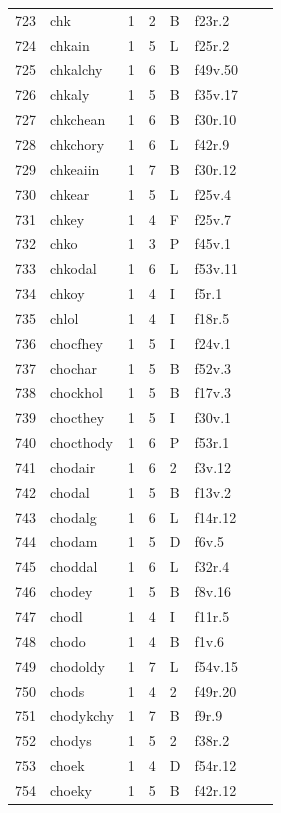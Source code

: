 \documentclass[11pt,a4paper]{article}
\begin{document}
\begin{landscape}
\begin{longtable}{@{}r>{\ttfamily}lrrl>{\ttfamily}l>{\raggedright\arraybackslash}p{80mm}>{\raggedright\arraybackslash}p{36mm}@{}}
723 & chk & 1 & 2 & B & f23r.2 &  & \\
724 & chkain & 1 & 5 & L & f25r.2 &  & \\
725 & chkalchy & 1 & 6 & B & f49v.50 &  & \\
726 & chkaly & 1 & 5 & B & f35v.17 &  & \\
727 & chkchean & 1 & 6 & B & f30r.10 &  & \\
728 & chkchory & 1 & 6 & L & f42r.9 &  & \\
729 & chkeaiin & 1 & 7 & B & f30r.12 &  & \\
730 & chkear & 1 & 5 & L & f25v.4 &  & \\
731 & chkey & 1 & 4 & F & f25v.7 &  & \\
732 & chko & 1 & 3 & P & f45v.1 &  & \\
733 & chkodal & 1 & 6 & L & f53v.11 &  & \\
734 & chkoy & 1 & 4 & I & f5r.1 &  & \\
735 & chlol & 1 & 4 & I & f18r.5 &  & \\
736 & chocfhey & 1 & 5 & I & f24v.1 &  & \\
737 & chochar & 1 & 5 & B & f52v.3 &  & \\
738 & chockhol & 1 & 5 & B & f17v.3 &  & \\
739 & chocthey & 1 & 5 & I & f30v.1 &  & \\
740 & chocthody & 1 & 6 & P & f53r.1 &  & \\
741 & chodair & 1 & 6 & 2 & f3v.12 &  & \\
742 & chodal & 1 & 5 & B & f13v.2 &  & \\
743 & chodalg & 1 & 6 & L & f14r.12 &  & \\
744 & chodam & 1 & 5 & D & f6v.5 &  & \\
745 & choddal & 1 & 6 & L & f32r.4 &  & \\
746 & chodey & 1 & 5 & B & f8v.16 &  & \\
747 & chodl & 1 & 4 & I & f11r.5 &  & \\
748 & chodo & 1 & 4 & B & f1v.6 &  & \\
749 & chodoldy & 1 & 7 & L & f54v.15 &  & \\
750 & chods & 1 & 4 & 2 & f49r.20 &  & \\
751 & chodykchy & 1 & 7 & B & f9r.9 &  & \\
752 & chodys & 1 & 5 & 2 & f38r.2 &  & \\
753 & choek & 1 & 4 & D & f54r.12 &  & \\
754 & choeky & 1 & 5 & B & f42r.12 &  & \\

\end{longtable}
\end{landscape}
\end{document}
